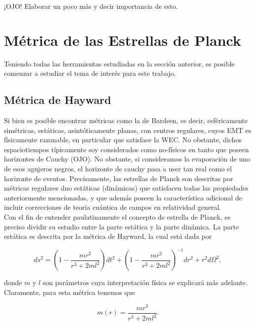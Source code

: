 \documentclass{article}
\numberwithin{equation}{section}
\theoremstyle{definition}
\begin{document}
¡OJO! Elaborar un poco más y decir importancia de esto.


\section{\label{planck stars section} Métrica de las Estrellas de Planck}

Teniendo todas las herramientas estudiadas en la sección anterior, es posible comenzar a estudiar el tema de interés para este trabajo.

\subsection{Métrica de Hayward}

Si bien es posible encontrar métricas como la de Bardeen, es decir, esféricamente simétricas, estáticas, asintóticamente planas, con centros regulares, cuyos EMT es físicamente razonable, en particular que satisface la WEC. No obstante, dichos espaciotiempos típicamente soy considerados como no-físicos en tanto que poseen horizontes de Cauchy (OJO). No obstante, si consideramos la evaporación de uno de esos agujeros negros, el horizonte de cauchy pasa a user tan real como el horizonte de eventos.  Precisamente, las estrellas de Planck son descritas por métricas regulares dno estáticas (dinámicas) que satisfacen todas las propiedades anteriormente mencionadas, y que además poseen la característica adicional de incluir correcciones de teoría cuántica de campos en relatividad general.\\

Con el fin de entender paulatinamente el concepto de estrella de Planck, es preciso dividir su estudio entre la parte estática y la parte dinámica. La parte estática es descrita por la métrica de Hayward, la cual está dada por 

\begin{equation}
\label{hayward metric}
ds^2 = \left( 1 - \frac{mr^2}{r^3 + 2ml^2} \right) dt^2 + \left( 1 - \frac{mr^2}{r^3 + 2ml^2} \right)^{-1} dr^2 + r^2d\Omega ^2,
\end{equation}

donde $m$ y $l$ son parámetros cuya interpretación física se explicará más adelante. Claramente, para esta métrica tenemos que

\begin{equation}
\label{hayward mass}
m(r) =  \frac{mr^3}{r^3 + 2ml^2}.
\end{equation}
\end{document}
